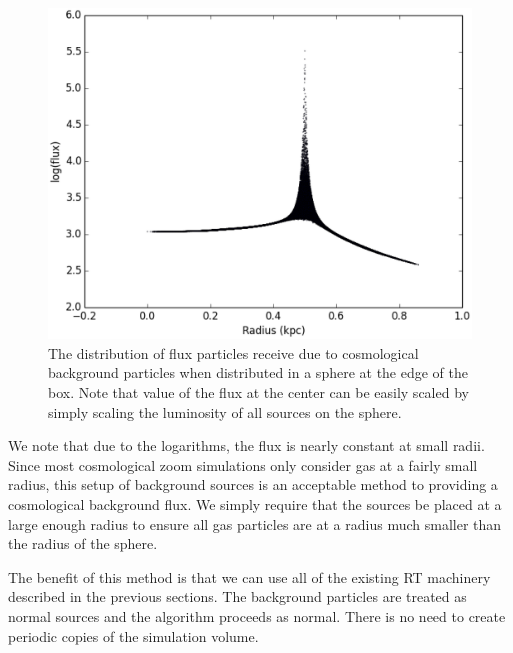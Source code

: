 \begin{figure}
\includegraphics[width=\textwidth]{graphics/backgroundflux.eps}
\caption[Flux due to the cosmological background.]{The distribution of flux particles receive due to cosmological background particles when distributed in a sphere at the edge of the box. Note that value of the flux at the center can be easily scaled by simply scaling the luminosity of all sources on the sphere.}
\label{fig:backgroundflux}
\end{figure}

We note that due to the logarithms, the flux is nearly constant at small radii. Since most cosmological zoom simulations only consider gas at a fairly small radius, this setup of background sources is an acceptable method to providing a cosmological background flux. We simply require that the sources be placed at a large enough radius to ensure all gas particles are at a radius much smaller than the radius of the sphere.

The benefit of this method is that we can use all of the existing RT machinery described in the previous sections. The background particles are treated as normal sources and the algorithm proceeds as normal. There is no need to create periodic copies of the simulation volume.

%
%
%
%

